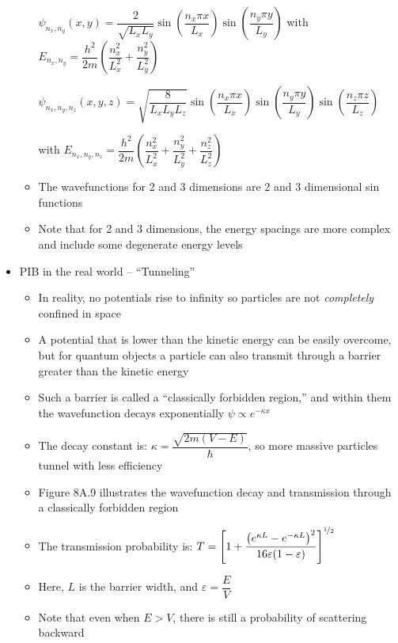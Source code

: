 \documentclass[12pt, openany, letterpaper]{memoir}
\begin{document}
\begin{itemize}
\begin{itemize}
		 $\psi_{n_x,n_y}(x,y) =\dfrac{2}{\sqrt{L_xL_y}}\sin\left(\dfrac{n_x\pi x}{L_x}\right)\sin\left(\dfrac{n_y\pi y}{L_y}\right)$ with $E_{n_x,n_y}=\dfrac{h^2}{2m}\left(\dfrac{n_x^2}{L_x^2}+\dfrac{n_y^2}{L_y^2}\right)$
		 
		 $\psi_{n_x,n_y,n_z}(x,y,z) =\sqrt{\dfrac{8}{L_xL_yL_z}}\sin\left(\dfrac{n_x\pi x}{L_x}\right)\sin\left(\dfrac{n_y\pi y}{L_y}\right)\sin\left(\dfrac{n_z\pi z}{L_z}\right)$
		 
		 with $E_{n_x,n_y,n_z}=\dfrac{h^2}{2m}\left(\dfrac{n_x^2}{L_x^2}+\dfrac{n_y^2}{L_y^2}+\dfrac{n_z^2}{L_z^2}\right)$
		 \item The wavefunctions for 2 and 3 dimensions are 2 and 3 dimensional sin functions
		 \item Note that for 2 and 3 dimensions, the energy spacings are more complex and include some degenerate energy levels		 
	\end{itemize}
	\item PIB in the real world -- “Tunneling”
	\begin{itemize}
		\item In reality, no potentials rise to infinity so particles are not \emph{completely} confined in space
		\item A potential that is lower than the kinetic energy can be easily overcome, but for quantum objects a particle can also transmit through a barrier greater than the kinetic energy
		\item Such a barrier is called a “classically forbidden region,” and within them the wavefunction decays exponentially $\psi\propto e^{-\kappa x}$
		\item The decay constant is: $\kappa = \dfrac{\sqrt{2m(V-E)}}{\hbar}$, so more massive particles tunnel with less efficiency
		\item Figure 8A.9 illustrates the wavefunction decay and transmission through a classically forbidden region
		\item The transmission probability is: $T=\left[1+\dfrac{\left(e^{\kappa L}-e^{-\kappa L}\right)^2}{16\varepsilon(1-\varepsilon)}\right]^{\nicefrac{1}{2}}$
		\item Here, $L$ is the barrier width, and $\varepsilon=\dfrac{E}{V}$
		\item Note that even when $E>V$, there is still a probability of scattering backward
	\end{itemize}
\end{itemize}
\end{document}
